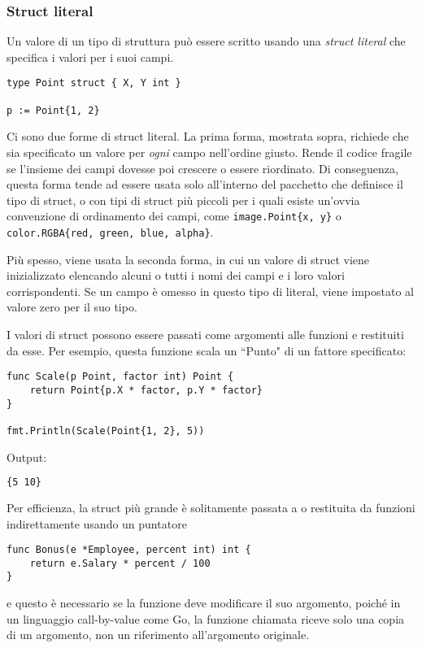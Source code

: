 \documentclass[../../../thesis.tex]{subfiles}
\begin{document}
    \subsubsection{Struct literal}
    Un valore di un tipo di struttura può essere scritto usando una \textit{struct literal} che specifica i valori per i suoi campi.
    \begin{lstlisting}[frame = single,label={lst:lstlisting3-4-1.1}]
type Point struct { X, Y int }

p := Point{1, 2}
    \end{lstlisting}
    Ci sono due forme di struct literal.
    La prima forma, mostrata sopra, richiede che sia specificato un valore per \textit{ogni} campo nell'ordine giusto.
    Rende il codice fragile se l'insieme dei campi dovesse poi crescere o essere riordinato.
    Di conseguenza, questa forma tende ad essere usata solo all'interno del pacchetto che definisce il tipo di struct, o con tipi di struct più piccoli per i quali esiste un'ovvia convenzione di ordinamento dei campi, come \verb"image.Point{x, y}" o \verb"color.RGBA{red, green, blue, alpha}".
    \hfill \vspace{12pt}

    Più spesso, viene usata la seconda forma, in cui un valore di struct viene inizializzato elencando alcuni o tutti i nomi dei campi e i loro valori corrispondenti.
    Se un campo è omesso in questo tipo di literal, viene impostato al valore zero per il suo tipo.
    \hfill \vspace{12pt}

    I valori di struct possono essere passati come argomenti alle funzioni e restituiti da esse.
    Per esempio, questa funzione scala un ``Punto" di un fattore specificato:
    \begin{lstlisting}[frame = single,label={lst:lstlisting3-4-1.2}]
func Scale(p Point, factor int) Point {
    return Point{p.X * factor, p.Y * factor}
}

fmt.Println(Scale(Point{1, 2}, 5))
    \end{lstlisting}
    Output:
    \begin{lstlisting}[language = bash, frame = L,label={lst:lstlisting3-4-1.3}]
{5 10}
    \end{lstlisting}
    Per efficienza, la struct più grande è solitamente passata a o restituita da funzioni indirettamente usando un puntatore
    \begin{lstlisting}[frame = single,label={lst:lstlisting3-4-1.4}]
func Bonus(e *Employee, percent int) int {
    return e.Salary * percent / 100
}
    \end{lstlisting}
    e questo è necessario se la funzione deve modificare il suo argomento, poiché in un linguaggio call-by-value come Go, la funzione chiamata riceve solo una copia di un argomento, non un riferimento all'argomento originale.
\end{document}
